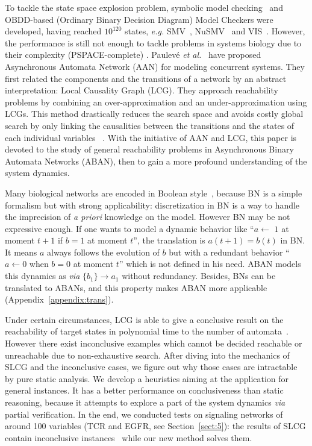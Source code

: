 \documentclass{article}
\newcommand{\ac}[3]{$\{#1\}\rightarrow#3$}
\theoremstyle{definition}
\begin{document}
To tackle the state space explosion problem, symbolic model checking~\cite{burch1992symbolic} and OBDD-based (Ordinary Binary Decision Diagram) Model Checkers were developed, having reached $10^{120}$ states, \textit{e.g.}
SMV~\cite{mcmillan1993symbolic}, NuSMV~\cite{cimatti2000nusmv} and VIS~\cite{brayton1996vis}.
However, the performance is still not enough to tackle problems in systems biology due to their complexity (PSPACE-complete) \cite{harel2002complexity}.
Paulev\'e \textit{et al.}~\cite{folschette2015,pauleve2011} have proposed Asynchronous Automata Network (AAN) for modeling concurrent systems.
They first related the components and the transitions of a network by an abstract interpretation: Local Causality Graph (LCG).
They approach reachability problems by combining an over-approximation and an under-approximation using LCGs.
This method drastically reduces the search space and avoids costly global search by only linking the causalities between the transitions and the states of each individual variables ~\cite{pauleve2012}.
With the initiative of AAN and LCG, this paper is devoted to the study of general reachability problems in Asynchronous Binary Automata Networks (ABAN), then to gain a more profound understanding of the system dynamics. 

Many biological networks are encoded in Boolean style~\cite{akutsu2007control,kauffman1969}, because BN is a simple formalism but with strong applicability: discretization in BN is a way to handle the imprecision of \textit{a priori} knowledge on the model.
However BN may be not expressive enough.
If one wants to model a dynamic behavior like ``$a\gets$ $1$ at moment $t+1$ if $b=1$ at moment $t$'', the translation is $a(t+1)=b(t)$ in BN.
It means $a$ always follows the evolution of $b$ but with a redundant behavior ``$a\gets 0$ when $b=0$ at moment $t$'' which is not defined in his need.
ABAN models this dynamics as \textit{via} \ac{b_1}{a_0}{a_1} without redundancy. 
Besides, BNs can be translated to ABANs, and this property makes ABAN more applicable (Appendix~\ref{appendix:trans}).

Under certain circumstances, LCG is able to give a conclusive result on the reachability of target states in polynomial time to the number of automata~\cite{pauleve2016goal}. 
However there exist inconclusive examples which cannot be decided reachable or unreachable due to non-exhaustive search.
After diving into the mechanics of SLCG and the inconclusive cases, we figure out why those cases are intractable by pure static analysis. 
We develop a heuristics aiming at the application for general instances. 
It has a better performance on conclusiveness than static reasoning, because it attempts to explore a part of the system dynamics \textit{via} partial verification.
In the end, we conducted tests on signaling networks of around 100 variables (TCR and EGFR, see Section~\ref{sect:5}): the results of SLCG contain inconclusive instances~\cite{folschette2015} while our new method solves them.
\end{document}
